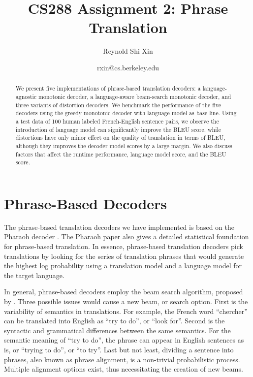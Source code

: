 \documentclass[12pt]{article}   %
\begin{document}
\title{CS288 Assignment 2: Phrase Translation}   %
\author{Reynold Shi Xin}         %
\date{rxin@cs.berkeley.edu}    %
\maketitle

\begin{abstract}
We present five implementations of phrase-based translation decoders: a language-agnostic monotonic decoder, a language-aware beam-search monotonic decoder, and three variants of distortion decoders. We benchmark the performance of the five decoders using the greedy monotonic decoder with language model as base line. Using a test data of 100 human labeled French-English sentence pairs, we observe the introduction of language model can significantly improve the BLEU score, while distortions have only minor effect on the quality of translation in terms of BLEU, although they improves the decoder model scores by a large margin. We also discuss factors that affect the runtime performance, language model score, and the BLEU score.
\end{abstract}


\section{Phrase-Based Decoders}
The phrase-based translation decoders we have implemented is based on the Pharaoh decoder \cite{pharaoh}. The Pharaoh paper also gives a detailed statistical foundation for phrase-based translation. In essence, phrase-based translation decoders pick translations by looking for the series of translation phrases that would generate the highest log probability using a translation model and a language model for the target language.

In general, phrase-based decoders employ the beam search algorithm, proposed by \cite{speech}. Three possible issues would cause a new beam, or search option. First is the variability of semantics in translations. For example, the French word ``chercher'' can be translated into English as ``try to do'', or ``look for''. Second is the syntactic and grammatical differences between the same semantics. For the semantic meaning of ``try to do'', the phrase can appear in English sentences as is, or ``trying to do'', or ``to try''. Last but not least, dividing a sentence into phrases, also known as phrase alignment, is a non-trivial probabilistic process. Multiple alignment options exist, thus necessitating the creation of new beams.
\end{document}
